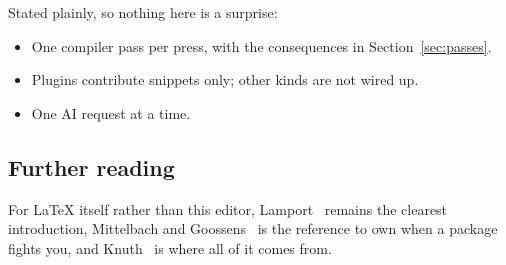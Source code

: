 Stated plainly, so nothing here is a surprise:

\begin{itemize}[leftmargin=*]
  \item One compiler pass per press, with the consequences in
        Section~\ref{sec:passes}.
  \item Plugins contribute snippets only; other kinds are not wired up.
  \item One AI request at a time.
\end{itemize}

\subsection{Further reading}

For \LaTeX{} itself rather than this editor, Lamport~\cite{lamport1994} remains
the clearest introduction, Mittelbach and Goossens~\cite{mittelbach2004} is the
reference to own when a package fights you, and Knuth~\cite{knuth1984} is where
all of it comes from.
